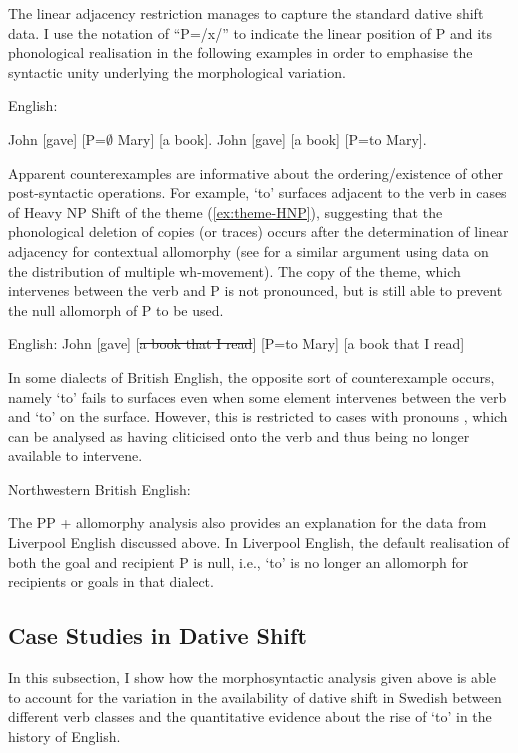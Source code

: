 	The linear adjacency restriction manages to capture the standard dative shift data. I use the notation of ``P=/x/'' to indicate the linear position of P and its phonological realisation in the following examples in order to emphasise the syntactic unity underlying the morphological variation.
	\begin{exe}
		\ex English:
		\begin{xlist}
	\ex John [gave] [P=$\emptyset$ Mary] [a book].
	\ex John [gave] [a book] [P=to Mary].
\end{xlist}
	\end{exe}
	Apparent counterexamples are informative about the ordering/existence of other post-syntactic operations. For example, `to' surfaces adjacent to the verb in cases of Heavy NP Shift of the theme (\ref{ex:theme-HNP}), suggesting that the phonological deletion of copies (or traces) occurs after the determination of linear adjacency for contextual allomorphy (see \citet{Franks} for a similar argument using data on the distribution of multiple wh-movement). The copy of the theme, which intervenes between the verb and P is not pronounced, but is still able to prevent the null allomorph of P to be used.
	\begin{exe}
		\ex \label{ex:theme-HNP} English: John [gave] [\sout{a book that I read}] [P=to Mary] [a book that I read]
	\end{exe}
	In some dialects of British English, the opposite sort of counterexample occurs, namely `to' fails to surfaces even when some element intervenes between the verb and `to' on the surface. However, this is restricted to cases with pronouns \citep{Biggs.2015}, which can be analysed as having cliticised onto the verb and thus being no longer available to intervene.
	\begin{exe}
		\ex Northwestern British English:
		\begin{xlist}
		\ex[ ]{John [gave=it] [P=$\emptyset$ Mary]}
		\ex[*]{John [gave] [the book] [P=$\emptyset$ Mary]}
	\end{xlist}
	\end{exe}
	The PP + allomorphy analysis also provides an explanation for the data from Liverpool English discussed above. In Liverpool English, the default realisation of both the goal and recipient P is null, i.e., `to' is no longer an allomorph for recipients or goals in that dialect.
	\subsection{Case Studies in Dative Shift}
		In this subsection, I show how the morphosyntactic analysis given above is able to account for the variation in the availability of dative shift in Swedish between different verb classes and the quantitative evidence about the rise of `to' in the history of English. 

